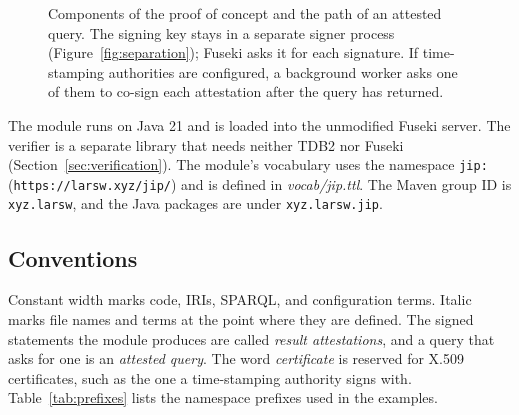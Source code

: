 \documentclass[11pt,a4paper]{article}
\newcommand{\code}[1]{\texttt{#1}}
\newcommand{\file}[1]{\textit{#1}}
\begin{document}
\begin{figure}[htbp]
\caption{Components of the proof of concept and the path of an attested query. The signing key
stays in a separate signer process (Figure~\ref{fig:separation}); Fuseki asks it for each
signature. If time-stamping authorities are configured, a background worker asks one of them
to co-sign each attestation after the query has returned.}
\label{fig:architecture}
\end{figure}

The module runs on Java 21 and is loaded into the unmodified Fuseki server. The verifier is
a separate library that needs neither TDB2 nor Fuseki (Section~\ref{sec:verification}). The
module's vocabulary uses the namespace \code{jip:} (\code{https://larsw.xyz/jip/}) and is
defined in \file{vocab/jip.ttl}. The Maven group ID is \code{xyz.larsw}, and the Java
packages are under \code{xyz.larsw.jip}.

\subsection*{Conventions}

Constant width marks code, IRIs, SPARQL, and configuration terms. Italic marks file names and
terms at the point where they are defined. The signed statements the module produces are called
\emph{result attestations}, and a query that asks for one is an \emph{attested query}. The word
\emph{certificate} is reserved for X.509 certificates, such as the one a time-stamping
authority signs with. Table~\ref{tab:prefixes} lists the namespace prefixes used in the
examples.
\end{document}
